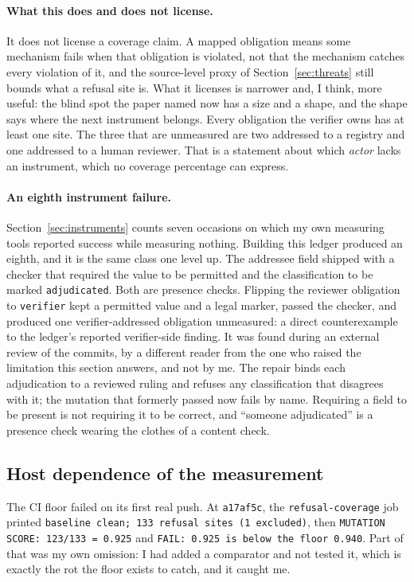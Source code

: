 \documentclass[11pt]{article}
\begin{document}
\paragraph{What this does and does not license.} It does not license a coverage claim. A mapped
obligation means some mechanism fails when that obligation is violated, not that the mechanism
catches every violation of it, and the source-level proxy of Section~\ref{sec:threats} still
bounds what a refusal site is. What it licenses is narrower and, I think, more useful: the
blind spot the paper named now has a size and a shape, and the shape says where the next
instrument belongs. Every obligation the verifier owns has at least one site. The three that are
unmeasured are two addressed to a registry and one addressed to a human reviewer. That is a
statement about which \emph{actor} lacks an instrument, which no coverage percentage can
express.

\paragraph{An eighth instrument failure.} Section~\ref{sec:instruments} counts seven occasions
on which my own measuring tools reported success while measuring nothing. Building this ledger
produced an eighth, and it is the same class one level up. The addressee field shipped with a
checker that required the value to be permitted and the classification to be marked
\texttt{adjudicated}. Both are presence checks. Flipping the reviewer obligation to
\texttt{verifier} kept a permitted value and a legal marker, passed the checker, and produced
one verifier-addressed obligation unmeasured: a direct counterexample to the ledger's reported
verifier-side finding. It was found during an external review of the commits, by a different
reader from the one who raised the limitation this section answers, and not by me.
The repair binds each adjudication to a reviewed ruling and refuses any classification that
disagrees with it; the mutation that formerly passed now fails by name. Requiring a field to be
present is not requiring it to be correct, and ``someone adjudicated'' is a presence check
wearing the clothes of a content check.

\subsection{Host dependence of the measurement}
\label{sec:host}

The CI floor failed on its first real push. At \texttt{a17af5c}, the \texttt{refusal-coverage}
job printed \texttt{baseline clean; 133 refusal sites (1 excluded)}, then \texttt{MUTATION
SCORE: 123/133 = 0.925} and \texttt{FAIL: 0.925 is below the floor 0.940}. Part of that was
my own omission: I had added a comparator and not tested it, which is exactly the rot the
floor exists to catch, and it caught me.
\end{document}
